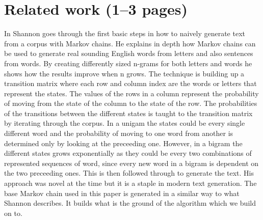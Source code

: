 \documentclass[a4paper,12pt]{article}
\begin{document}
\newpage
\section{Related work (1--3 pages)}
\label{sec:relwork}
%

In \cite{shannon48} Shannon goes through the first basic steps in how to naively generate text from a corpus with Markov chains. 
He explains in depth how Markov chains can be used to generate real sounding English words from letters and also sentences from words. 
By creating differently sized n-grams for both letters and words he shows how the results improve when n grows. 
The technique is building up a transition matrix where each row and column index are the words or letters that represent the states. 
The values of the rows in a column represent the probability of moving from the state of the column to the state of the row. 
The probabilities of the transitions between the different states is taught to the transition matrix by iterating through the corpus.
In a unigam the states could be every single different word and the probability of moving to one word from another is determined only by looking at the preceeding one.
However, in a bigram the different states grows exponentially as they could be every two combinations of represented sequences of word, 
since every new word in a bigram is dependent on the two preceeding ones.
This is then followed through to generate the text.
His approach was novel at the time but it is a staple in modern text generation. 
The base Markov chain used in this paper is generated in a similar way to what Shannon describes. 
It builds what is the ground of the algorithm which we build on to.
\end{document}
